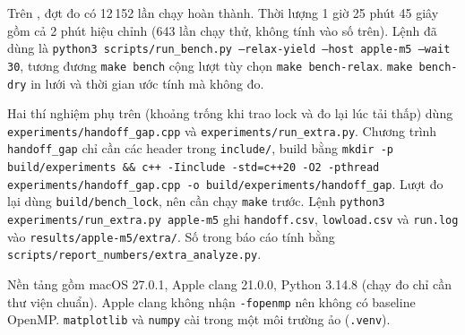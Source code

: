
Trên , đợt đo có 12\,152 lần chạy hoàn thành. Thời lượng 1 giờ 25 phút 45 giây gồm cả
2 phút hiệu chỉnh (643 lần chạy thử, không tính vào số trên). Lệnh đã dùng là
\texttt{python3 scripts/run\_bench.py --relax-yield --host apple-m5 --wait 30}, tương đương
\texttt{make bench} cộng lượt tùy chọn \texttt{make bench-relax}. \texttt{make bench-dry} in lưới và thời
gian ước tính mà không đo.

Hai thí nghiệm phụ trên  (khoảng trống khi trao lock và đo lại lúc tải thấp) dùng
\texttt{experiments/handoff\_gap.cpp} và \texttt{experiments/run\_extra.py}. Chương trình
\texttt{handoff\_gap} chỉ cần các header trong \texttt{include/}, build bằng \texttt{mkdir -p
build/experiments \&\& c++ -Iinclude -std=c++20 -O2 -pthread experiments/handoff\_gap.cpp -o
build/experiments/handoff\_gap}. Lượt đo lại dùng \texttt{build/bench\_lock}, nên cần chạy
\texttt{make} trước. Lệnh \texttt{python3 experiments/run\_extra.py apple-m5} ghi
\texttt{handoff.csv}, \texttt{lowload.csv} và \texttt{run.log} vào \texttt{results/apple-m5/extra/}.
Số trong báo cáo tính bằng \texttt{scripts/report\_numbers/extra\_analyze.py}.

Nền tảng gồm macOS 27.0.1, Apple clang 21.0.0, Python 3.14.8 (chạy đo chỉ cần thư viện chuẩn).
Apple clang không nhận \texttt{-fopenmp} nên không có baseline OpenMP. \texttt{matplotlib} và
\texttt{numpy} cài trong một môi trường ảo (\texttt{.venv}).

